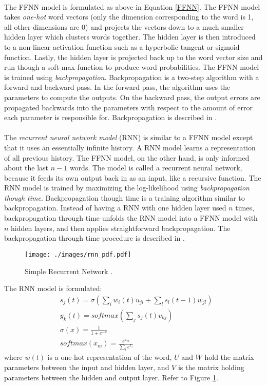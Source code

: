 \paragraph{}
The FFNN model is formulated as above in Equation \ref{FFNN}. The FFNN model takes \emph{one-hot} word vectors (only the dimension corresponding to the word is 1, all other dimensions are 0) and projects the vectors down to a much smaller hidden layer which clusters words together. The hidden layer is then introduced to a non-linear activation function such as a hyperbolic tangent or sigmoid function. Lastly, the hidden layer is projected back up to the word vector size and run though a soft-max function to produce word probabilities. The FFNN model is trained using \emph{backpropagation}. Backpropagation is a two-step algorithm with a forward and backward pass. In the forward pass, the algorithm uses the parameters to compute the outputs. On the backward pass, the output errors are propagated backwards into the parameters with respect to the amount of error each parameter is responsible for. Backpropagation is described in \cite{Bengio2003}.

\paragraph{}
The \emph{recurrent neural network model} (RNN) is similar to a FFNN model except that it uses an essentially infinite history. A RNN model learns a representation of all previous history. The FFNN model, on the other hand, is only informed about the last $n-1$ words. The model is called a recurrent neural network, because it feeds its own output back in as an input, like a recursive function. The RNN model is trained by maximizing the log-likelihood using \emph{backpropagation though time}. Backpropagation though time is a training algorithm similar to backpropagation. Instead of having a RNN with one hidden layer used $n$ times, backpropagation through time unfolds the RNN model into a FFNN model with $n$ hidden layers, and then applies straightforward backpropagation. The backpropagation through time procedure is described in \cite{Mikolov2012}.

\begin{figure}
\centering
\texttt{[image: ./images/rnn\_pdf.pdf]}
\caption{Simple Recurrent Network \cite[pg. 34]{Mikolov2012}.}
\label{fig:RNNfigure}
\end{figure}

The RNN model is formulated:
\begin{align}
&s_j(t) = \sigma \left( \sum_i w_i(t) u_{ji} + \sum_l s_l (t-1) w_{jl} \right)
\\
&y_k(t) = softmax \left( \sum_j s_j(t) v_{kj} \right)
\\ 
&\sigma(x) = \frac{1}{1+e^{-x}} \nonumber
\\ 
&softmax(x_m) = \frac{e^{x_m} }{ \sum_i e^{x_i} }  \nonumber
\end{align}
where $w(t)$ is a one-hot representation of the word, $U$ and $W$ hold the matrix parameters between the input and hidden layer, and $V$ is the matrix holding parameters between the hidden and output layer. Refer to Figure \ref{fig:RNNfigure}.

